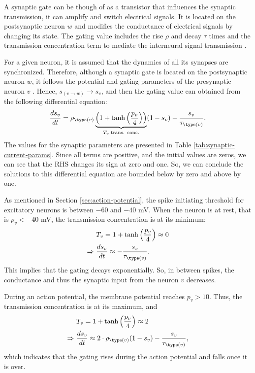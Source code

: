 A synaptic gate can be though of as a transistor that influences the synaptic transmission, it can amplify and switch electrical signals. It is located on the postsynaptic neuron $w$ and modifies the conductance of electrical signals by changing its state. The gating value includes the rise $\rho$ and decay $\tau$ times and the transmission concentration term to mediate the interneural signal transmission \cite{Destexhe1994}.

For a given neuron, it is assumed that the dynamics of all its synapses are synchronized. Therefore, although a synaptic gate is located on the postsynaptic neuron $w$, it follows the potential and gating parameters of the presynaptic neuron $v$ \cite{Lowet2015}. Hence, $s_{(v \to w)} \to s_v$, and then the gating value can obtained from the following differential equation:
\begin{equation}
    \frac{ds_v}{dt} = \rho_{\type(v)} \underbrace{\left( 1 + \tanh \left( \frac{p_{v}}{4} \right) \right)}_{T_v: \text{trans. conc.}} (1 - s_v) - \frac{s_v}{\tau_{\type(v)}}.
    \label{eq:synaptic-gates}\end{equation}
The values for the synaptic parameters are presented in Table \ref{tab:synaptic-current-params}.
Since all terms are positive, and the initial values are zeros, we can see that the RHS changes its sign at zero and one. So, we can conclude the solutions to this differential equation are bounded below by zero and above by one.

As mentioned in Section \ref{sec:action-potential}, the spike initiating threshold for excitatory neurons is between $-60$ and $-40$ mV. When the neuron is at rest, that is $p_v < -40$ mV, the transmission concentration is at its minimum:
\begin{gather}
\begin{split}
    & T_v = 1 + \tanh \left( \frac{p_{v}}{4} \right) \approx 0 \\
    \Rightarrow \ & \frac{ds_v}{dt} \approx - \frac{s_v}{\tau_{\type(v)}}.
\end{split}
\end{gather}
This implies that the gating decays exponentially.
So, in between spikes, the conductance and thus the synaptic input from the neuron $v$ decreases. 

During an action potential, the membrane potential reaches $p_v > 10$. Thus, the transmission concentration is at its maximum, and
\begin{gather}
\begin{split}
    & T_v = 1 + \tanh \left( \frac{p_{v}}{4} \right) \approx 2 \\
    \Rightarrow \ & \frac{ds_v}{dt} \approx 2 \cdot \rho_{\type(v)} (1 - s_v) - \frac{s_v}{\tau_{\type(v)}},
\end{split}
\end{gather}
which indicates that the gating rises during the action potential and falls once it is over. 

